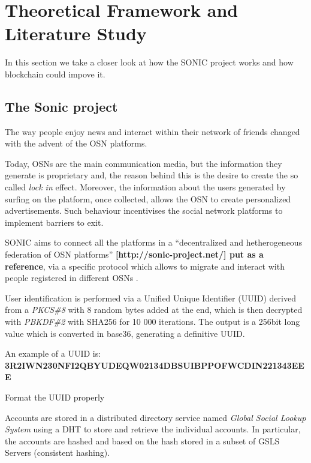 \section{Theoretical Framework and Literature Study}
\label{S:2}

In this section we take a closer look at how the SONIC project works and how blockchain could impove it. 

\subsection{The Sonic project}

The way people enjoy news and interact within their network of friends changed with the advent of the OSN platforms. \par
Today, OSNs are the main communication media, but the information they generate is proprietary and, the reason behind this is the desire to create the so called \textit{lock in} effect.
Moreover, the information about the users generated by surfing on the platform, once collected, allows the OSN to create personalized advertisements. Such behaviour incentivises the social network platforms to implement barriers to exit. \par
SONIC aims to connect all the platforms in a ``decentralized and hetherogeneous federation of OSN platforms'' \textbf{[http://sonic-project.net/] put as a reference}, via a specific protocol which allows to migrate and interact with people registered in different OSNs \cite{gondor_sonic:_2014}. \par
User identification is performed via a Unified Unique Identifier (UUID) derived from a \textit{PKCS\#8} \cite{pkcs8}with 8 random bytes added at the end, which is then decrypted with \textit{PBKDF\#2} \cite{pkcs8} with SHA256 \cite{hansen_us} for 10 000 iterations.
The output is a 256bit long value which is converted in base36, generating a definitive UUID. \par

An example of a UUID is: \\ \textbf{3R2IWN230NFI2QBYUDEQW02134DBSUIBPPOFWCDIN221343EEE}\cite{gondor_sonic:_2014} \par

\begin{notation}
Format the UUID properly
\end{notation}

Accounts are stored in a distributed directory service named \textit{Global Social Lookup System} using a DHT to store and retrieve the individual accounts. In particular, the accounts are hashed and based on the hash stored in a subset of GSLS Servers (consistent hashing). \par

